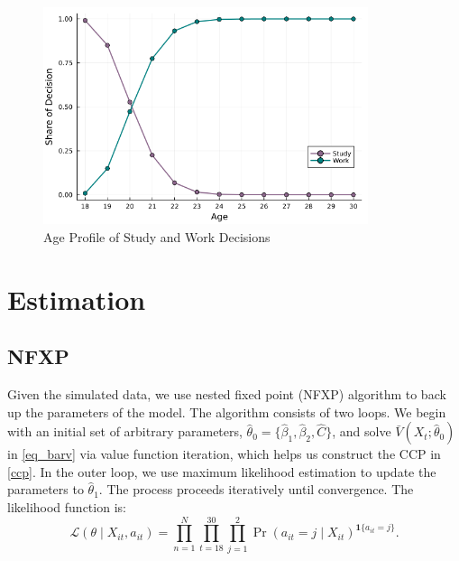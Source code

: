 \documentclass[a4paper, 12pt]{article}
\begin{document}
\begin{figure}[] 
    \centering
    \includegraphics[width=0.85\textwidth]{decision_by_age.png}
    \caption{Age Profile of Study and Work Decisions}
    \label{fig:decision_by_age}
\end{figure}




\section{Estimation}
\subsection{NFXP}
Given the simulated data, we use nested fixed point (NFXP) algorithm to back up the parameters of the model. 
The algorithm consists of two loops. 
We begin with an initial set of arbitrary parameters, $\hat\theta_0=\{\hat\beta_1, \hat\beta_2, \hat{C}\}$, 
and solve $\bar V(X_t; \hat\theta_0)$ in \eqref{eq_barv} via value function iteration, which helps us construct the CCP in \eqref{ccp}. 
In the outer loop, we use maximum likelihood estimation to update the parameters to $\hat\theta_1$. The process proceeds iteratively until convergence.
The likelihood function is:
\begin{equation}
    \mathcal{L}(\theta\mid X_{it}, a_{it}) 
    = \prod_{n=1}^N\prod_{t=18}^{30}\prod_{j=1}^2\Pr(a_{it}=j\mid X_{it})^{\mathbf{1}\{a_{it}=j\}}.
    \label{likelihood_func}
    \end{equation}
\end{document}

